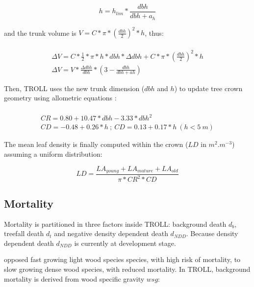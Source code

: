 \documentclass[12pt,]{article}
\theoremstyle{definition}
\theoremstyle{definition}
\theoremstyle{definition}
\theoremstyle{remark}
\begin{document}
\begin{equation}
  h = h_{lim}*\frac{dbh}{dbh + a_h}
  \label{eq:h}
\end{equation}

and the trunk volume is \(V = C * \pi * (\frac{dbh}{2})^2*h\), thus:

\begin{equation}
  \begin{array}{c} \\
    \Delta V = C*\frac{1}{2}*\pi*h*dbh*\Delta dbh + C * \pi * (\frac{dbh}{2})^2*h \\
    \Delta V = V*\frac{\Delta dbh}{dbh}*(3-\frac{dbh}{dbh + ah})
  \end{array}
  \label{eq:Deltadbh}
\end{equation}

Then, TROLL uses the new trunk dimension (\(dbh\) and \(h\)) to update
tree crown geometry using allometric equations \citep{Chave2005}:

\begin{equation}
  \begin{array}{c} \\
    CR = 0.80 + 10.47*dbh - 3.33*dbh^2\\
    CD = -0.48 + 0.26*h~;~CD = 0.13 + 0.17*h~(h<5~m)
  \end{array}
  \label{eq:C}
\end{equation}

The mean leaf density is finally computed within the crown (\(LD\) in
\(m^2.m^{-3}\)) assuming a uniform distribution:

\begin{equation}
  LD = \frac{LA_{young}+LA_{mature}+LA_{old}}{\pi*CR^2*CD}
  \label{eq:LD}
\end{equation}

\subsection{Mortality}\label{mortality}

Mortality is partitioned in three factors inside TROLL: background death
\(d_b\), treefall death \(d_t\) and negative density dependent death
\(d_{NDD}\). Because density dependent death \(d_{NDD}\) is currently at
development stage.

\citet{Chave2009} opposed fast growing light wood species species, with
high risk of mortality, to slow growing dense wood species, with reduced
mortality. In TROLL, background mortality is derived from wood specific
gravity \(wsg\):
\end{document}
